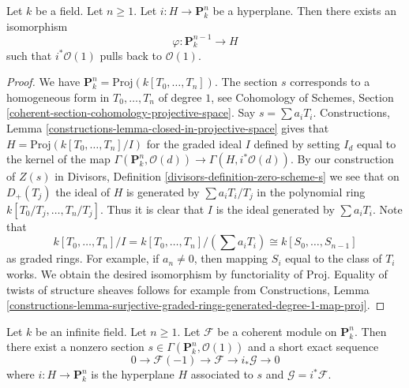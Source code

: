 \begin{lemma}
\label{lemma-hyperplane}
Let $k$ be a field. Let $n \geq 1$.
Let $i : H \to \mathbf{P}^n_k$ be a hyperplane.
Then there exists an isomorphism
$$
\varphi : \mathbf{P}^{n - 1}_k \longrightarrow H
$$
such that $i^*\mathcal{O}(1)$ pulls back to $\mathcal{O}(1)$.
\end{lemma}

\begin{proof}
We have $\mathbf{P}^n_k = \text{Proj}(k[T_0, \ldots, T_n])$.
The section $s$ corresponds to a homogeneous form in $T_0, \ldots, T_n$
of degree $1$, see
Cohomology of Schemes, Section
\ref{coherent-section-cohomology-projective-space}.
Say $s = \sum a_i T_i$.
Constructions, Lemma \ref{constructions-lemma-closed-in-projective-space}
gives that
$H = \text{Proj}(k[T_0, \ldots, T_n]/I)$ for the graded ideal $I$
defined by setting $I_d$ equal to the kernel of the map
$\Gamma(\mathbf{P}^n_k, \mathcal{O}(d)) \to \Gamma(H, i^*\mathcal{O}(d))$.
By our construction of $Z(s)$ in Divisors, 
Definition \ref{divisors-definition-zero-scheme-s}
we see that on $D_{+}(T_j)$ the ideal of $H$ is generated by
$\sum a_i T_i/T_j$ in the polynomial ring
$k[T_0/T_j, \ldots, T_n/T_j]$. Thus it is clear that $I$ is the ideal
generated by $\sum a_i T_i$. Note that
$$
k[T_0, \ldots, T_n]/I = k[T_0, \ldots, T_n]/(\sum a_i T_i) \cong
k[S_0, \ldots, S_{n - 1}]
$$
as graded rings. For example, if $a_n \not = 0$, then mapping
$S_i$ equal to the class of $T_i$ works. We obtain the desired isomorphism
by functoriality of $\text{Proj}$.
Equality of twists of structure sheaves follows for example from
Constructions, Lemma
\ref{constructions-lemma-surjective-graded-rings-generated-degree-1-map-proj}.
\end{proof}

\begin{lemma}
\label{lemma-exact-sequence-induction}
Let $k$ be an infinite field. Let $n \geq 1$.
Let $\mathcal{F}$ be a coherent module on $\mathbf{P}^n_k$.
Then there exist a nonzero section
$s \in \Gamma(\mathbf{P}^n_k, \mathcal{O}(1))$
and a short exact sequence
$$
0 \to \mathcal{F}(-1) \to \mathcal{F} \to i_*\mathcal{G} \to 0
$$
where $i : H \to \mathbf{P}^n_k$ is the hyperplane $H$ associated to $s$
and $\mathcal{G} = i^*\mathcal{F}$.
\end{lemma}

